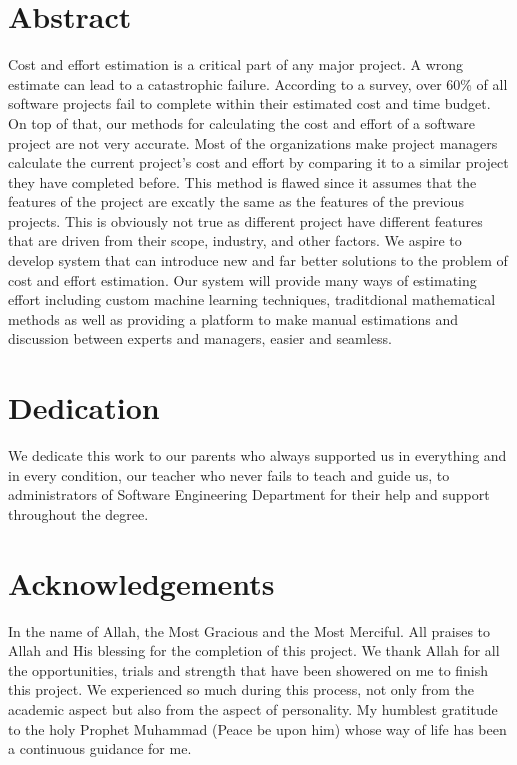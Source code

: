 \section*{Abstract}
Cost and effort estimation is a critical part of any major project. A wrong estimate can lead to a catastrophic failure. According to a survey, over 60\% of all software projects fail to complete within their estimated cost and time budget. On top of that, our methods for calculating the cost and effort of a software project are not very accurate. Most of the organizations make project managers calculate the current project's cost and effort by comparing it to a similar project they have completed before. This method is flawed since it assumes that the features of the project are excatly the same as the features of the previous projects. This is obviously not true as different project have different features that are driven from their scope, industry, and other factors. We aspire to develop system that can introduce new and far better solutions to the problem of cost and effort estimation. Our system will provide many ways of estimating effort including custom machine learning techniques, traditdional mathematical methods as well as providing a platform to make manual estimations and discussion between experts and managers, easier and seamless.

\newpage


\section*{Dedication}
We dedicate this work to our parents who always supported us in everything and in every condition,
our teacher who never fails to teach and guide us, to administrators of Software Engineering
Department for their help and support throughout the degree.

\newpage


\section*{Acknowledgements}
In the name of Allah, the Most Gracious and the Most Merciful. All praises to Allah and His blessing
for the completion of this project. We thank Allah for all the opportunities, trials and strength that
have been showered on me to finish this project. We experienced so much during this process, not
only from the academic aspect but also from the aspect of personality. My humblest gratitude to the
holy Prophet Muhammad (Peace be upon him) whose way of life has been a continuous guidance for
me.


